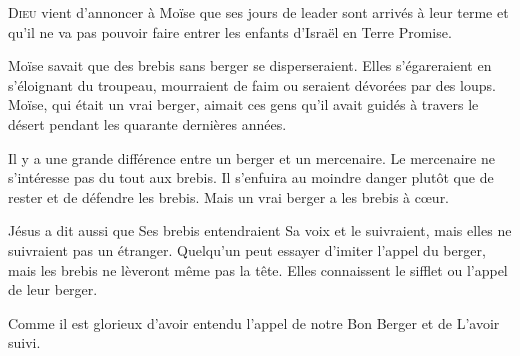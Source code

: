 





\lettrine{D}{ieu} vient d'annoncer à Moïse que ses jours de leader
 sont arrivés à leur terme et qu'il ne va pas pouvoir
 faire entrer les enfants d'Israël en Terre Promise.

Moïse savait que des brebis sans berger se disperseraient.
 Elles s'égareraient en s'éloignant du troupeau,
 mourraient de faim ou seraient dévorées par des loups.
 Moïse, qui était un vrai berger,
 aimait ces gens qu'il avait guidés à travers le désert
 pendant les quarante dernières années.

Il y a une grande différence entre un berger et un mercenaire.
 Le mercenaire ne s'intéresse pas du tout aux brebis.
 Il s'enfuira au moindre danger plutôt que de rester et de défendre les brebis.
 Mais un vrai berger a les brebis à c\oe{}ur.


Jésus a dit aussi que Ses brebis entendraient Sa voix et le suivraient,
 mais elles ne suivraient pas un étranger.
 Quelqu'un peut essayer d'imiter l'appel du berger,
 mais les brebis ne lèveront même pas la tête.
 Elles connaissent le sifflet ou l'appel de leur berger.

Comme il est glorieux d'avoir entendu l'appel de notre Bon Berger
 et de L'avoir suivi. 

\dvrule



